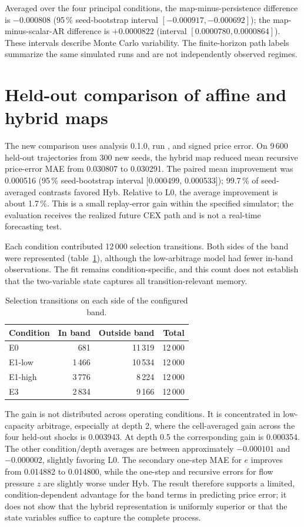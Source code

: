 Averaged over the four principal conditions, the map-minus-persistence difference is $-0.000808$ (95\,\% seed-bootstrap interval $[-0.000917,-0.000692]$); the map-minus-scalar-AR difference is $+0.0000822$ (interval $[0.0000780,0.0000864]$). These intervals describe Monte Carlo variability. The finite-horizon path labels summarize the same simulated runs and are not independently observed regimes.

\section{Held-out comparison of affine and hybrid maps}
\label{sec:hybrid-results}

The new comparison uses analysis 0.1.0, run \code{\HybridRunID}, and signed price error. On 9\,600 held-out trajectories from 300 new seeds, the hybrid map reduced mean recursive price-error MAE from 0.030807 to 0.030291. The paired mean improvement was 0.000516 (95\,\% seed-bootstrap interval [0.000499, 0.000533]); 99.7\,\% of seed-averaged contrasts favored Hyb. Relative to L0, the average improvement is about 1.7\,\%. This is a small replay-error gain within the specified simulator; the evaluation receives the realized future CEX path and is not a real-time forecasting test.

Each condition contributed 12\,000 selection transitions. Both sides of the band were represented (table~\ref{tab:hybrid-regimes}), although the low-arbitrage model had fewer in-band observations. The fit remains condition-specific, and this count does not establish that the two-variable state captures all transition-relevant memory.

\begin{table}[htbp]
\centering
\caption{Selection transitions on each side of the configured band.}
\label{tab:hybrid-regimes}
\small
\begin{tabular}{@{}lrrr@{}}
\toprule
Condition & In band & Outside band & Total \\
\midrule
E0 & 681 & 11\,319 & 12\,000 \\
E1-low & 1\,466 & 10\,534 & 12\,000 \\
E1-high & 3\,776 & 8\,224 & 12\,000 \\
E3 & 2\,834 & 9\,166 & 12\,000 \\
\bottomrule
\end{tabular}
\end{table}

The gain is not distributed across operating conditions. It is concentrated in low-capacity arbitrage, especially at depth 2, where the cell-averaged gain across the four held-out shocks is 0.003943. At depth 0.5 the corresponding gain is 0.000354. The other condition/depth averages are between approximately $-0.000101$ and $-0.000002$, slightly favoring L0. The secondary one-step MAE for $e$ improves from 0.014882 to 0.014800, while the one-step and recursive errors for flow pressure $z$ are slightly worse under Hyb. The result therefore supports a limited, condition-dependent advantage for the band terms in predicting price error; it does not show that the hybrid representation is uniformly superior or that the state variables suffice to capture the complete process.

